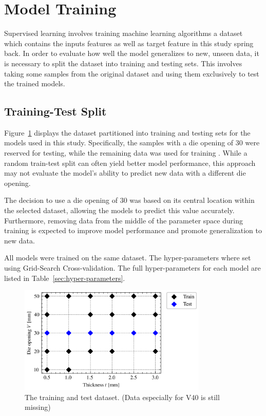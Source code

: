\section{Model Training}\label{sec:model-training}
Supervised learning involves training machine learning algorithms a dataset which contains the inputs features as well
as target feature in this study spring back.
In order to evaluate how well the model generalizes to new, unseen data, it is necessary to
split the dataset into training and testing sets.
This involves taking some samples from the original dataset and using them exclusively to test the trained models.

\subsection{Training-Test Split}\label{subsec:training-test-split}
Figure~\ref{fig:train_test_split} displays the dataset partitioned into training and
testing sets for the models used in this study.
Specifically, the samples with a die
opening of 30 were reserved for testing, while the remaining data was used for training .
While a random train-test split can often yield better model performance, this
approach may not evaluate the model's ability to predict new data with a different die
opening.

The decision to use a die opening of 30 was based on its central location within the
selected dataset, allowing the models to predict this value accurately.
Furthermore, removing data from the middle of the parameter space during training is
expected to improve model performance and promote generalization to new data.

All models were trained on the same dataset.
The hyper-parameters where set using Grid-Search Cross-validation.
The full hyper-parameters for each model are listed in Table~\ref{sec:hyper-parameters}.

\begin{figure}[ht]
    \begin{tcolorbox}[arc=0pt,boxrule=0.5pt]
        \centering
        \includegraphics[width=0.8\textwidth]{chap4/images/test_train_split}
    \end{tcolorbox}
    \caption{The training and test dataset. (Data especially for V40 is
    still missing)}
    \label{fig:train_test_split}
\end{figure}

